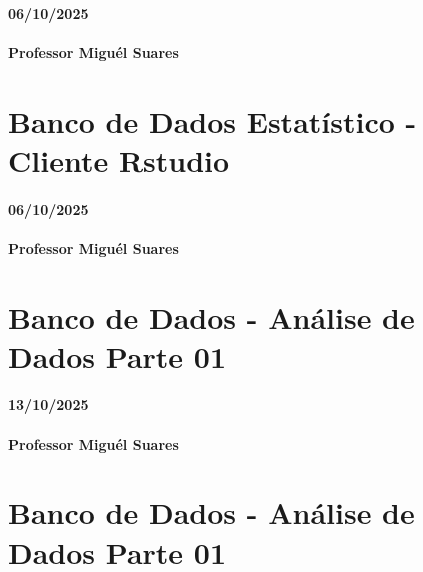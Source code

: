 \documentclass[
]{book}
\begin{document}
\subsubsection*{06/10/2025}\label{section-13}

\subsubsection*{Professor Miguél Suares}\label{professor-miguuxe9l-suares-13}

\chapter{Banco de Dados Estatístico - Cliente Rstudio}\label{banco-de-dados-estatuxedstico---cliente-rstudio-1}

\subsubsection*{06/10/2025}\label{section-14}

\subsubsection*{Professor Miguél Suares}\label{professor-miguuxe9l-suares-14}

\chapter{Banco de Dados - Análise de Dados Parte 01}\label{banco-de-dados---anuxe1lise-de-dados-parte-01}

\subsubsection*{13/10/2025}\label{section-15}

\subsubsection*{Professor Miguél Suares}\label{professor-miguuxe9l-suares-15}

\chapter{Banco de Dados - Análise de Dados Parte 01}\label{banco-de-dados---anuxe1lise-de-dados-parte-01-1}
\end{document}
